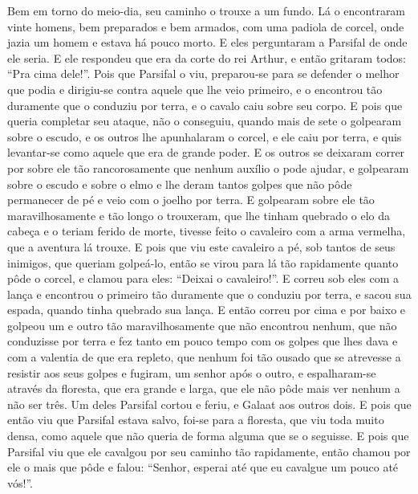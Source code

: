 Bem em torno do meio-dia, seu caminho o trouxe a um fundo. Lá o encontraram
vinte homens, bem preparados e bem armados, com uma padiola de corcel, onde
jazia um homem e estava há pouco morto. E eles perguntaram a Parsifal de onde
ele seria. E ele respondeu que era da corte do rei Arthur, e então gritaram
todos: “Pra cima dele!”. Pois que Parsifal o viu, preparou-se para se defender
o melhor que podia e dirigiu-se contra aquele que lhe veio primeiro, e o
encontrou tão duramente que o conduziu por terra, e o cavalo caiu sobre seu
corpo. E pois que queria completar seu ataque, não o conseguiu, quando mais de
sete o golpearam sobre o escudo, e os outros lhe apunhalaram o corcel, e ele
caiu por terra, e quis levantar-se como aquele que era de grande poder. E os
outros se deixaram correr por sobre ele tão rancorosamente que nenhum auxílio o
pode ajudar, e golpearam sobre o escudo e sobre o elmo e lhe deram tantos
golpes que não pôde permanecer de pé e veio com o joelho por terra. E golpearam
sobre ele tão maravilhosamente e tão longo o trouxeram, que lhe tinham quebrado
o elo da cabeça e o teriam ferido de morte, tivesse feito o cavaleiro com a
arma vermelha, que a aventura lá trouxe. E pois que viu este cavaleiro a pé,
sob tantos de seus inimigos, que queriam golpeá-lo, então se virou para lá tão
rapidamente quanto pôde o corcel, e clamou para eles: “Deixai o cavaleiro!”. E
correu sob eles com a lança e encontrou o primeiro tão duramente que o conduziu
por terra, e sacou sua espada, quando tinha quebrado sua lança. E então correu
por cima e por baixo e golpeou um e outro tão maravilhosamente que não
encontrou nenhum, que não conduzisse por terra e fez tanto em pouco tempo com
os golpes que lhes dava e com a valentia de que era repleto, que nenhum foi tão
ousado que se atrevesse a resistir aos seus golpes e fugiram, um senhor após o
outro, e espalharam-se através da floresta, que era grande e larga, que ele não
pôde mais ver nenhum a não ser três. Um deles Parsifal cortou e feriu, e
Galaat aos outros dois. E pois que então viu que Parsifal estava salvo, foi-se
para a floresta, que viu toda muito densa,  como aquele que não queria de forma
alguma que se o seguisse. E pois que Parsifal viu que ele cavalgou por seu
caminho tão rapidamente, então chamou por ele o mais que pôde e falou: “Senhor,
esperai até que eu cavalgue um pouco até vós!”. 

